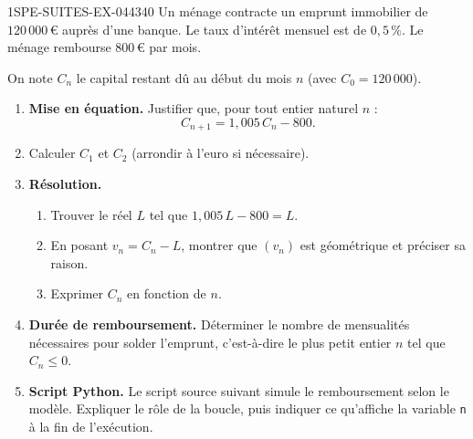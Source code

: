 \begin{exercice}{1SPE-SUITES-EX-044}{3}{40}
Un ménage contracte un emprunt immobilier de $120\,000$\,€ auprès d'une banque. Le taux d'intérêt mensuel est de $0{,}5\,\%$. Le ménage rembourse $800$\,€ par mois.

On note $C_n$ le capital restant dû au début du mois $n$ (avec $C_0 = 120\,000$).

\begin{enumerate}
  \item \textbf{Mise en équation.} Justifier que, pour tout entier naturel $n$ :
  \[
    C_{n+1} = 1{,}005\, C_n - 800.
  \]

  \item Calculer $C_1$ et $C_2$ (arrondir à l'euro si nécessaire).

  \item \textbf{Résolution.}
  \begin{enumerate}
    \item Trouver le réel $L$ tel que $1{,}005\,L - 800 = L$.
    \item En posant $v_n = C_n - L$, montrer que $(v_n)$ est géométrique et préciser sa raison.
    \item Exprimer $C_n$ en fonction de $n$.
  \end{enumerate}

  \item \textbf{Durée de remboursement.} Déterminer le nombre de mensualités nécessaires pour solder l'emprunt, c'est-à-dire le plus petit entier $n$ tel que $C_n \leq 0$.

  \item \textbf{Script Python.} Le script source suivant simule le remboursement selon le modèle. Expliquer le rôle de la boucle, puis indiquer ce qu'affiche la variable \texttt{n} à la fin de l'exécution.
\end{enumerate}
\end{exercice}


